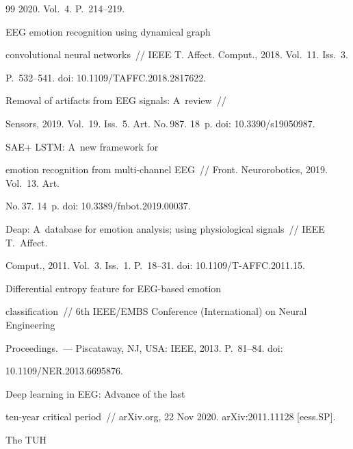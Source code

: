 {{\begin{thebibliography}{99}
2020.  Vol.~4.  P.~214--219. 


   EEG emotion recognition using dynamical graph 

convolutional neural networks~/\!\!/ IEEE T. Affect. Comput., 2018. Vol.~11. Iss.~3. 

P.~532--541. doi: 10.1109\!/\!TAFFC.2018.2817622.


   Removal of artifacts from EEG signals: A~review~/\!\!/ 

Sensors, 2019. Vol.~19. Iss.~5. Art. No.\,987. 18~p. doi: 10.3390\!/\!s19050987.


   SAE+ LSTM: A~new framework for 

emotion recognition from multi-channel EEG~/\!\!/ Front. Neurorobotics, 2019. Vol.~13. Art. 

No.\,37. 14~p. doi: 10.3389\!/\!fnbot.2019.00037.



Deap: A~database for emotion analysis; using physiological signals~/\!\!/ IEEE T.~Affect. 

Comput., 2011. Vol.~3. Iss.~1. P.~18--31. doi: 10.1109\!/\!T-AFFC.2011.15.


   Differential entropy feature for EEG-based emotion 

classification~/\!\!/ 6th  IEEE/EMBS Conference (International) on Neural Engineering 

Proceedings.~--- Piscataway, NJ, USA: IEEE, 2013. P.~81--84. doi: 

10.1109\!/\!NER.2013.6695876.


   Deep learning in EEG: Advance of the last

  ten-year critical period~/\!\!/ arXiv.org, 22 Nov 2020. arXiv:2011.11128 [eess.SP]. 


   The TUH 


\end{thebibliography}}}
